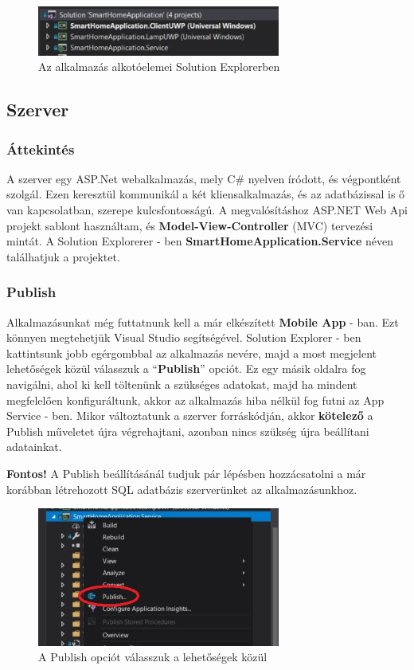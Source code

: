\documentclass[a4paper,12pt]{report}
\begin{document}
    \begin{figure}[H]
        \centering
        \includegraphics[width=8cm]{images/structure.jpg}
        \caption{Az alkalmazás alkotóelemei Solution Explorerben}
        \label{fig: SolutionExplorer}
    \end{figure}

    \subsection{Szerver}

    \subsubsection{Áttekintés}
    A szerver egy ASP.Net webalkalmazás, mely C\# nyelven íródott, és végpontként szolgál. Ezen keresztül kommunikál a két kliensalkalmazás, és az adatbázissal
    is ő van kapcsolatban, szerepe kulcsfontosságú. A megvalósításhoz ASP.NET Web Api projekt sablont használtam, és \textbf{Model-View-Controller}
    (MVC) tervezési mintát. A Solution Explorerer - ben \textbf{SmartHomeApplication.Service} néven találhatjuk a projektet.

    \subsubsection{Publish}
    Alkalmazásunkat még futtatnunk kell a már elkészített \textbf{Mobile App} - ban. Ezt könnyen megtehetjük Visual Studio segítségével.
    Solution Explorer - ben kattintsunk jobb egérgombbal az alkalmazás nevére, majd a most megjelent lehetőségek közül válasszuk
    a ``\textbf{Publish}'' opciót. Ez egy másik oldalra fog navigálni, ahol ki kell töltenünk a szükséges adatokat, majd ha mindent
    megfelelően konfiguráltunk, akkor az alkalmazás hiba nélkül fog futni az App Service - ben.
    Mikor változtatunk a szerver forráskódján, akkor \textbf{kötelező} a Publish műveletet újra végrehajtani, azonban nincs szükség
    újra beállítani adatainkat.

    \textbf{Fontos!} A Publish beállításánál tudjuk pár lépésben hozzácsatolni a már korábban létrehozott SQL adatbázis szerverünket az alkalmazásunkhoz.

    \begin{figure}[H]
        \centering
        \includegraphics[width=8cm]{images/publishbutton.jpg}
        \caption{A Publish opciót válasszuk a lehetőségek közül}
        \label{fig: Publish}
    \end{figure}
\end{document}
